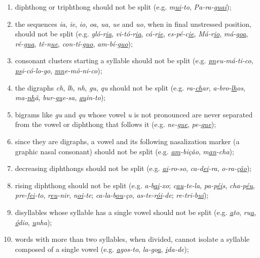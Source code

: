 \documentclass{article}
\begin{document}
\begin{enumerate}
    \item\label{rule-di-triphthong} diphthong or triphthong should not be split
	(e.g. \emph{m\underline{\emph{ui}}-to}, \emph{Pa-ra-g\underline{\emph{uai}}});
    \item\label{rule-unstressed} the sequences \emph{ia}, \emph{ie}, \emph{io}, \emph{oa}, \emph{ua},
	\emph{ue} and \emph{uo}, when in final unstressed position, should not be split 
	(e.g. \emph{gló-r\underline{\emph{ia}}}, \emph{vi-tó-r\underline{\emph{ia}}}, 
	\emph{cá-r\underline{\emph{ie}}}, \emph{es-pé-c\underline{\emph{ie}}}, 
	\emph{Má-r\underline{\emph{io}}}, \emph{má-g\underline{\emph{oa}}}, 
	\emph{ré-g\underline{\emph{ua}}}, \emph{tê-n\underline{\emph{ue}}}, 
	\emph{con-tí-g\underline{\emph{uo}}}, \emph{am-bí-g\underline{\emph{uo}}});
    \item\label{rule-c-clusters} consonant clusters starting a syllable should not be
	split (e.g. \emph{\underline{\emph{pn}}eu-má-ti-co}, \emph{\underline{\emph{ps}}i-có-lo-go}, 
	\emph{\underline{\emph{mn}}e-mô-ni-co});
    \item\label{rules-digraphs-ns} the digraphs	\emph{ch}, \emph{lh}, \emph{nh}, \emph{gu}, \emph{qu} 
	should not be split (e.g. \emph{ra-\underline{\emph{ch}}ar},
	\emph{a-bro-\underline{\emph{lh}}os}, \emph{ma-\underline{\emph{nh}}ã},
	\emph{bur-\underline{\emph{gu}}e-sa}, \emph{\underline{\emph{qu}}in-to});
    \item\label{rule-guqu} bigrams like \emph{gu} and \emph{qu} whose vowel \emph{u} is not 
	pronounced are never separated from the vowel or diphthong that follows it 
	(e.g. \emph{ne-\underline{\emph{gu}e}}, \emph{pe-\underline{\emph{qu}e}});
    \item\label{rule-nasalization} since they are digraphs, a vowel and its following 
	nasalization marker (a graphic nasal consonant) should not be split (e.g. \emph{\underline{\emph{am}}-bição},
	\emph{m\underline{\emph{an}}-cha});
    \item\label{rule-decreasing} decreasing diphthongs should not be split (e.g. 
	\emph{\underline{\emph{ai}}-ro-so}, \emph{ca-d\underline{\emph{ei}}-ra}, 
	\emph{o-ra-ç\underline{\emph{ão}}});
    \item\label{rule-rising} rising diphthong should not be split (e.g.
	\emph{a-b\underline{\emph{ai}}-xo}; \emph{c\underline{\emph{au}}-te-la}, 
	\emph{pa-p\underline{\emph{éi}}s}, \emph{cha-p\underline{\emph{éu}}}, 
	\emph{pre-f\underline{\emph{ei}}-to}, \emph{r\underline{\emph{eu}}-nir},
	\emph{n\underline{\emph{oi}}-te}; \emph{ca-la-b\underline{\emph{ou}}-ço}, 
	\emph{as-te-r\underline{\emph{ói}}-de}; 
	\emph{re-tri-b\underline{\emph{ui}}});
    \item\label{rule-singlev} disyllables whose syllable has a single vowel should 
	not be split (e.g. \emph{\underline{\emph{a}}to}, \emph{ru\underline{\emph{a}}}, 
	\emph{\underline{\emph{ó}}dio}, \emph{\underline{\emph{u}}nha});
    \item\label{rule-orphan} words with more than two syllables, when divided, cannot 
	isolate a syllable composed of a single vowel (e.g. \emph{\underline{\emph{a}}gos-to}, 
	\emph{la-go\underline{\emph{a}}}, \emph{\underline{\emph{i}}da-de});



\end{enumerate}
\end{document}
